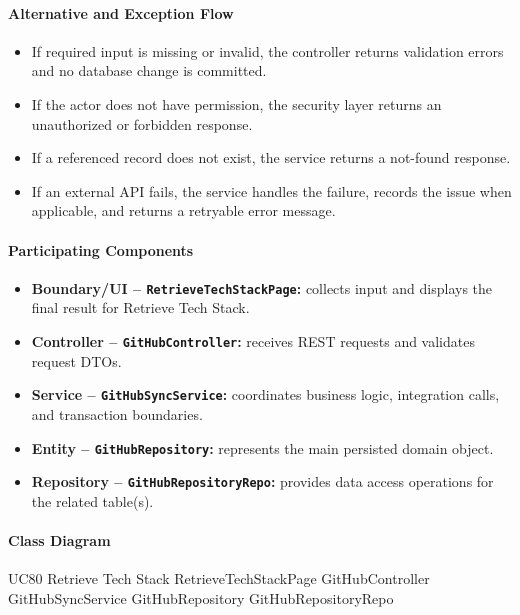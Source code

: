 \paragraph{Alternative and Exception Flow}

\begin{itemize}
    \item If required input is missing or invalid, the controller returns validation errors and no database change is committed.
    \item If the actor does not have permission, the security layer returns an unauthorized or forbidden response.
    \item If a referenced record does not exist, the service returns a not-found response.
    \item If an external API fails, the service handles the failure, records the issue when applicable, and returns a retryable error message.
\end{itemize}

\paragraph{Participating Components}

\begin{itemize}
    \item \textbf{Boundary/UI -- \texttt{RetrieveTechStackPage}:} collects input and displays the final result for Retrieve Tech Stack.
    \item \textbf{Controller -- \texttt{GitHubController}:} receives REST requests and validates request DTOs.
    \item \textbf{Service -- \texttt{GitHubSyncService}:} coordinates business logic, integration calls, and transaction boundaries.
    \item \textbf{Entity -- \texttt{GitHubRepository}:} represents the main persisted domain object.
    \item \textbf{Repository -- \texttt{GitHubRepositoryRepo}:} provides data access operations for the related table(s).
\end{itemize}

\paragraph{Class Diagram}

\ClassDiagram
{UC80 Retrieve Tech Stack}
{RetrieveTechStackPage}
{GitHubController}
{GitHubSyncService}
{GitHubRepository}
{GitHubRepositoryRepo}

